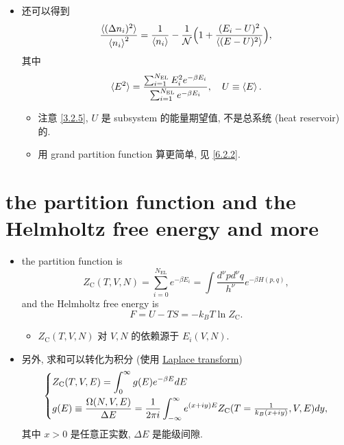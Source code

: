 \begin{itemize}
	\item 还可以得到
	\begin{equation}
		\frac{\braket{(\Delta n_i)^2}}{\braket{n_i}^2} = \frac{1}{\braket{n_i}} - \frac{1}{\mathcal{N}} \Big( 1 + \frac{(E_i - U)^2}{\braket{(E - U)^2}} \Big),
	\end{equation}
	其中
	\begin{equation}
		\braket{E^2} = \frac{\sum_{i = 1}^{N_\text{EL}} E_i^2 e^{- \beta E_i}}{\sum_{i = 1}^{N_\text{EL}} e^{- \beta E_i}}, \quad U \equiv \braket{E}.
	\end{equation}
	\begin{itemize}
		\item 注意 \eqref{3.2.5}, $U$ 是 subsystem 的能量期望值, 不是总系统 (heat reservoir) 的.
		
		\item 用 grand partition function 算更简单, 见 \eqref{6.2.2}.
	\end{itemize}
\end{itemize}

\section{the partition function and the Helmholtz free energy and more}
\begin{itemize}
	\item the partition function is
	\begin{equation}
		Z_\text{C}(T, V, N) = \sum_{i = 0}^{N_\text{EL}} e^{- \beta E_i} = \int \frac{d^\nu p d^\nu q}{h^\nu} e^{- \beta H(p, q)},
	\end{equation}
	and the Helmholtz free energy is
	\begin{equation}
		F = U - T S = - k_B T \ln Z_\text{C}.
	\end{equation}
	\begin{itemize}
		\item $Z_\text{C}(T, V, N)$ 对 $V, N$ 的依赖源于 $E_i(V, N)$.
	\end{itemize}
	
	\item 另外, 求和可以转化为积分 (使用 \href{https://en.wikipedia.org/wiki/Laplace_transform#Inverse_Laplace_transform}{Laplace transform})
	\begin{equation}
		\begin{dcases}
			Z_\text{C}(T, V, E) = \int_0^\infty g(E) e^{- \beta E} dE \\
			g(E) \equiv \frac{\Omega(N, V, E)}{\Delta E} = \frac{1}{2 \pi i} \int_{- \infty}^\infty e^{(x + i y) E} Z_\text{C}(T = {\textstyle \frac{1}{k_B (x + i y)}}, V, E) dy,
		\end{dcases}
	\end{equation}
	其中 $x > 0$ 是任意正实数, $\Delta E$ 是能级间隙. 
\end{itemize}

